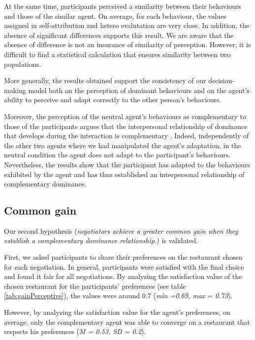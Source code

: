 \documentclass[10pt, a4paper, twocolumn]{article} %
\begin{document}
At the same time, participants perceived a similarity between their behaviours and those of the similar agent. On average, for each behaviour, the values assigned in self-attribution and hetero evalutation are very close. In addition, the absence of significant differences supports this result. We are aware that the absence of difference is not an insurance of similarity of perception. However, it is difficult to find a statistical calculation that ensures similarity between two populations.

More generally, the results obtained support the consistency of our decision-making model both on the perception of dominant behaviours and on the agent's ability to perceive and adapt correctly to the other person's behaviours.  

Moreover, the perception of the neutral agent's behaviours as complementary to those of the participants argues that the interpersonal relationship of dominance that develops during the interaction is complementary \cite{burgoonnonverbal}. Indeed, independently of the other two agents where we had manipulated the agent's adaptation, in the neutral condition the agent does not adapt to the participant's behaviours. Nevertheless, the results show that the participant has adapted to the behaviours exhibited by the agent and has thus established an interpersonal relationship of complementary dominance.

\subsection{Common gain}
Our second hypothesis (\textit{negotiators achieve a greater common gain when they establish a complementary dominance relationship.}) is validated. 

First, we asked participants to share their preferences on the restaurant chosen for each negotiation.
In general, participants were satisfied with the final choice and found it fair for all negotiations. 
By analyzing the satisfaction value of the chosen restaurant for the participants' preferences (see table \ref{tab:gainPerceptive}), the values were around 0.7 (\emph{min =0.69, max = 0.73}). 

However, by analyzing the satisfaction value for the agent's preferences, on average, only the complementary agent was able to converge on a restaurant that respects his preferences (\emph{M = 0.53, SD = 0.2}). 
\end{document}

